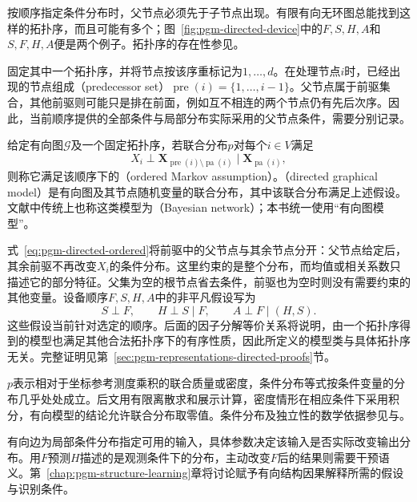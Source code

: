 按顺序指定条件分布时，父节点必须先于子节点出现。有限有向无环图总能找到这样的拓扑序，而且可能有多个；图~\ref{fig:pgm-directed-device}中的$F,S,H,A$和$S,F,H,A$便是两个例子。拓扑序的存在性参见。

固定其中一个拓扑序，并将节点按该序重标记为$1,\ldots,d$。在处理节点$i$时，已经出现的节点组成（predecessor set）$\operatorname{pre}(i)=\{1,\ldots,i-1\}$。父节点属于前驱集合，其他前驱则可能只是排在前面，例如互不相连的两个节点仍有先后次序。因此，当前顺序提供的全部条件与局部分布实际采用的父节点条件，需要分别记录。

\begin{definition}[有序Markov假设与有向图模型]
  \label{def:pgm-directed-ordered}
  给定有向图$\mathcal{G}$及一个固定拓扑序，若联合分布$p$对每个$i\in V$满足
  \begin{equation}
    X_i\perp
    \bm{X}_{\operatorname{pre}(i)\setminus\operatorname{pa}(i)}
    \mid\bm{X}_{\operatorname{pa}(i)},
    \label{eq:pgm-directed-ordered}
  \end{equation}
  则称它满足该顺序下的（ordered Markov assumption）。（directed graphical model）是有向图及其节点随机变量的联合分布，其中该联合分布满足上述假设。文献中传统上也称这类模型为（Bayesian network）；本书统一使用“有向图模型”。
\end{definition}

式~\eqref{eq:pgm-directed-ordered}将前驱中的父节点与其余节点分开：父节点给定后，其余前驱不再改变$X_i$的条件分布。这里约束的是整个分布，而均值或相关系数只描述它的部分特征。父集为空的根节点省去条件，前驱也为空时则没有需要约束的其他变量。设备顺序$F,S,H,A$中的非平凡假设写为
\[
  S\perp F,\qquad H\perp S\mid F,\qquad A\perp F\mid(H,S).
\]
这些假设当前针对选定的顺序。后面的因子分解等价关系将说明，由一个拓扑序得到的模型也满足其他合法拓扑序下的有序性质，因此所定义的模型类与具体拓扑序无关。完整证明见第~\ref{sec:pgm-representations-directed-proofs}节。

$p$表示相对于坐标参考测度乘积的联合质量或密度，条件分布等式按条件变量的分布几乎处处成立。后文用有限离散求和展示计算，密度情形在相应条件下采用积分，有向模型的结论允许联合分布取零值。条件分布及独立性的数学依据参见与。

有向边为局部条件分布指定可用的输入，具体参数决定该输入是否实际改变输出分布。用$F$预测$H$描述的是观测条件下的分布，主动改变$F$后的结果则需要干预语义。第~\ref{chap:pgm-structure-learning}章将讨论赋予有向结构因果解释所需的假设与识别条件。

